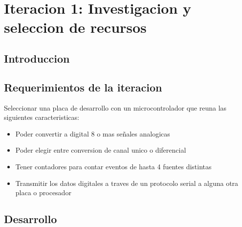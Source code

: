 \chapter{Iteracion 1: Investigacion y seleccion de recursos} %
\label{cha:iteracion_1}

\section{Introduccion} %
\label{sec:introduccion}




\section{Requerimientos de la iteracion} %
\label{sec:requerimientos_de_la_iteracion}

Seleccionar una placa de desarrollo con un microcontrolador que reuna las siguientes caracteristicas:
\begin{itemize}
  \item Poder convertir a digital 8 o mas señales analogicas
  \item Poder elegir entre conversion de canal unico o diferencial
  \item Tener contadores para contar eventos de hasta 4 fuentes distintas
  \item Transmitir los datos digitales a traves de un protocolo serial a alguna otra placa o procesador
\end{itemize}



\section{Desarrollo} %
\label{sec:desarrollo}

